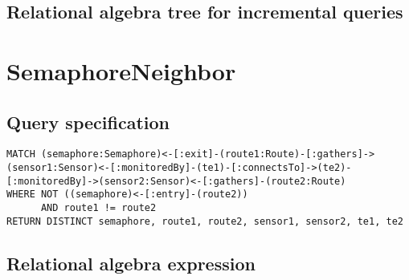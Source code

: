 \subsection*{Relational algebra tree for incremental queries}

\section{SemaphoreNeighbor}

\subsection*{Query specification}

\begin{lstlisting}
MATCH (semaphore:Semaphore)<-[:exit]-(route1:Route)-[:gathers]->(sensor1:Sensor)<-[:monitoredBy]-(te1)-[:connectsTo]->(te2)-[:monitoredBy]->(sensor2:Sensor)<-[:gathers]-(route2:Route)
WHERE NOT ((semaphore)<-[:entry]-(route2))
      AND route1 != route2
RETURN DISTINCT semaphore, route1, route2, sensor1, sensor2, te1, te2
\end{lstlisting}

\subsection*{Relational algebra expression}

